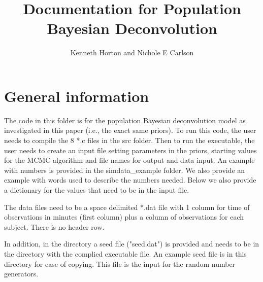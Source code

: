 \documentclass[12pt, oneside]{article}   	%
\begin{document}
\title{Documentation for Population Bayesian Deconvolution}
\author{Kenneth Horton and Nichole E Carlson}
\date{}
\maketitle

\section{General information}
The code in this folder is for the population Bayesian deconvolution model as investigated in this paper (i.e., the exact same priors).  To run this code, the user needs to compile the 8 *.c files in the src folder. Then to run the executable, the user needs to create an input file setting parameters in the priors, starting values for the MCMC algorithm and file names for output and data input. An example with numbers is provided in the simdata\_example folder. We also provide an example with words used to describe the numbers needed. Below we also provide a dictionary for the values that need to be in the input file.

The data files need to be a space delimited *.dat file with 1 column for time of observations in minutes (first column) plus a column of observations for each subject. There is no header row.  

In addition, in the directory a seed file ("seed.dat") is provided and needs to be in the directory with the complied executable file.  An example seed file is in this directory for ease of copying.  This file is the input for the random number generators.
\end{document}
